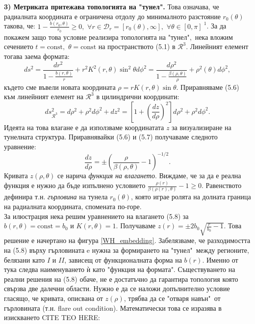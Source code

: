 \newpage

\textbf{3) Метриката притежава топологията на "тунел".} Това означава, че радиалната координата е ограничена отдолу до минималното разстояние $r_0(\theta)$ такова, че: $1 - \frac{b(r_0,\theta)}{r_0} \ge 0 ,\,\,\forall r\in \mathcal{D}_r = [r_0(\theta),\infty],\,\,\forall\theta\in[0,\pi]^{\,\,1}$. За да покажем защо това условие реализира топологията на "тунел"$,$ нека вложим сечението $t = \text{const},\,\,\theta = \text{const}$ на пространството (5.1) в $\mathcal{R}^3$. Линейният елемент тогава заема формата:
\begin{equation}
	ds^2 = \frac{dr^2}{1 - \frac{b(r,\theta)}{r}} + r^2K^2(r,\theta)\sin^2\theta d\phi^2 = \frac{d\rho^2}{1 - \frac{\beta(\rho,\theta)}{\rho}} + \rho^2(\theta)d\phi^2,
\end{equation}
където сме въвели новата координата $\rho = rK(r,\theta)\sin\theta$. Приравняваме (5.6) към линейният елемент на $\mathcal{R}^3$ в цилиндрични координати:
\begin{equation}
	ds^2_{\mathcal{R}^3} = d\rho^2 + \rho^2d\phi^2 + dz^2 = \left[1 + \left(\frac{dz}{d\rho}\right)^2\right]d\rho^2 + \rho^2d\phi^2.
\end{equation}
Идеята на това влагане е да използваме координатата $z$ за визуализиране на тунелната структура. Приравнявайки (5.6) и (5.7) получаваме следното уравнение:
\begin{equation}
	\frac{dz}{d\rho} = \pm \left(\frac{\rho}{\beta(\rho,\theta)} - 1\right)^{-1/2}.
\end{equation}
Кривата $z(\rho,\theta)$ се нарича \emph{функция на влагането}. Виждаме, че за да е реална функция е нужно да бъде изпълнено условието $\frac{\rho(r)}{\beta(\rho(r),\theta)}-1\ge 0$. Равенството дефинира т.н. \emph{гърловина} на тунела $r_0(\theta)$, която играе ролята на долната граница на радиалната координата, спомената по-горе.\\
За илюстрация нека решим уравнението на влагането (5.8) за $b(r,\theta) = \text{const} = b_0$ и $K(r,\theta) = 1$. Получаваме $z(r) = \pm 2b_0\sqrt{\frac{r}{b_0} - 1}$. Това решение е начертано на фигура \ref{WH_embedding}. Забелязваме, че разходимостта на (5.8) върху гърловината e нужна за формирането на "тунел"$\,$ между регионите, белязани като $I$ и $II$, зависещ от функционалната форма на $b(r)$. Именно от тука следва наименуването ѝ като "функция на формата". Съществуването на реални решения на (5.8) обаче, не е достатъчно да гарантира топология която свързва две далечни области. Нужно е да се наложи допълнително условие гласящо, че кривата, описвана от $z(\rho)$, трябва да се "отваря навън"$\,$ от гърловината (т.н. flare out condition). Математически това се изразява в изискването CITE TEO HERE:
